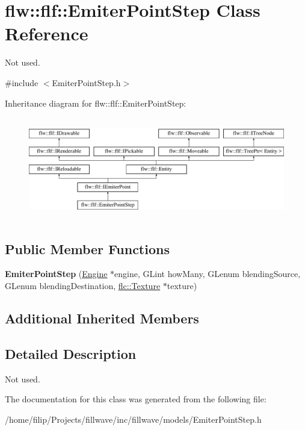 \hypertarget{classflw_1_1flf_1_1EmiterPointStep}{}\section{flw\+:\+:flf\+:\+:Emiter\+Point\+Step Class Reference}
\label{classflw_1_1flf_1_1EmiterPointStep}


Not used.  




{\ttfamily \#include $<$Emiter\+Point\+Step.\+h$>$}

Inheritance diagram for flw\+:\+:flf\+:\+:Emiter\+Point\+Step\+:\begin{figure}[H]
\begin{center}
\leavevmode
\includegraphics[height=4.487180cm]{classflw_1_1flf_1_1EmiterPointStep}
\end{center}
\end{figure}
\subsection*{Public Member Functions}
\begin{DoxyCompactItemize}
\item 
{\bfseries Emiter\+Point\+Step} (\hyperlink{classflw_1_1Engine}{Engine} $\ast$engine, G\+Lint how\+Many, G\+Lenum blending\+Source, G\+Lenum blending\+Destination, \hyperlink{classflw_1_1flc_1_1Texture}{flc\+::\+Texture} $\ast$texture)\hypertarget{classflw_1_1flf_1_1EmiterPointStep_afb53156f26a793f33e0d86646b87c4cc}{}\label{classflw_1_1flf_1_1EmiterPointStep_afb53156f26a793f33e0d86646b87c4cc}

\end{DoxyCompactItemize}
\subsection*{Additional Inherited Members}


\subsection{Detailed Description}
Not used. 

The documentation for this class was generated from the following file\+:\begin{DoxyCompactItemize}
\item 
/home/filip/\+Projects/fillwave/inc/fillwave/models/Emiter\+Point\+Step.\+h\end{DoxyCompactItemize}

